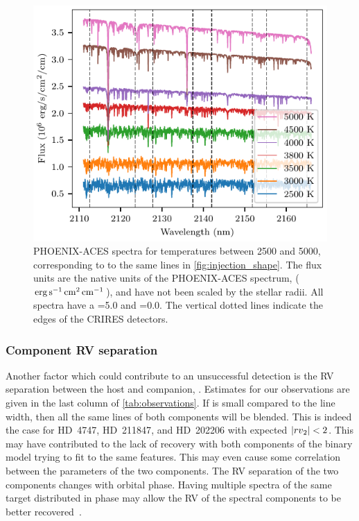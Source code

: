 \begin{figure}
    \centering
    \includegraphics[width=\hsize]{./figures/companion_recovery/companion_spectra.pdf}
    \caption{{PHOENIX-ACES} spectra for temperatures between 2500 and 5000\K{}, corresponding to to the same lines in \cref{fig:injection_shape}.
The flux units are the native units of the {PHOENIX-ACES} spectrum, (\(\rm erg\,s^{-1}\,cm^{2}\,cm^{-1}\)), and have not been scaled by the stellar radii.
All spectra have a \logg{}=5.0 and \feh{}=0.0.
The vertical dotted lines indicate the edges of the CRIRES detectors.}
    \label{fig:comp_spectra}
\end{figure}

\subsubsection{Component {RV} separation}
\label{subsubsec:rv_seperation}
Another factor which could contribute to an unsuccessful detection is the {RV} separation between the host and companion, \Rvtwo{}.
Estimates for our observations are given in the last column of \cref{tab:observations}.
If \Rvtwo{} is small compared to the line width, then all the same lines of both components will be blended.
This is indeed the case for {HD~4747}, {HD~211847}, and {HD~202206} with expected \(|{rv{}}_{2}{}| < 2\)\kmps{}.
This may have contributed to the lack of recovery with both components of the binary model trying to fit to the same features.
This may even cause some correlation between the parameters of the two components.
The {RV} separation of the two components changes with orbital phase.
Having multiple spectra of the same target distributed in phase may allow the {RV} of the spectral components to be better recovered~\citep [e.g. ][]{czekala_disentangling_2017, sablowski_spectral_2016}.


